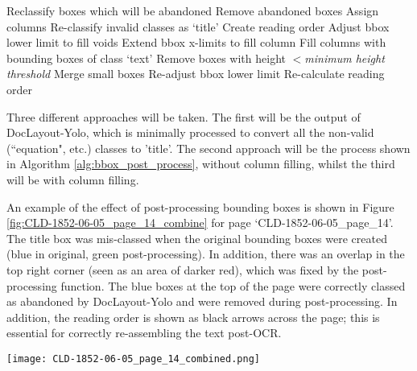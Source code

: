\documentclass{article} %
\begin{document}
\begin{algorithm}
\caption{Bounding Box Processing Algorithm}
\begin{algorithmic}[1]
\State Reclassify boxes which will be abandoned
\State Remove abandoned boxes
\State Assign columns
\State Re-classify invalid classes as `title'
\State Create reading order
\State Adjust bbox lower limit to fill voids
\State Extend bbox x-limits to fill column
    \State Fill columns with bounding boxes of class `text'
\EndIf
\State Remove boxes with height $<$\textit{minimum height threshold}
\State Merge small boxes
\State Re-adjust bbox lower limit
\State Re-calculate reading order
\end{algorithmic}
\label{alg:bbox_post_process}
\end{algorithm}

Three different approaches will be taken. The first will be the output of DocLayout-Yolo, which is minimally processed to convert all the non-valid (``equation", etc.) classes to 'title'. The second approach will be the process shown in Algorithm \ref{alg:bbox_post_process}, without column filling, whilst the third will be with column filling. 

An example of the effect of post-processing bounding boxes is shown in Figure \ref{fig:CLD-1852-06-05_page_14_combine} for page `CLD-1852-06-05\_page\_14'. The title box was mis-classed when the original bounding boxes were created (blue in original, green post-processing). In addition, there was an overlap in the top right corner (seen as an area of darker red), which was fixed by the post-processing function. The blue boxes at the top of the page were correctly classed as abandoned by DocLayout-Yolo and were removed during post-processing. In addition, the reading order is shown as black arrows across the page; this is essential for correctly re-assembling the text post-OCR.

\begin{figure*}
    \centering
    \texttt{[image: CLD-1852-06-05\_page\_14\_combined.png]}
    \caption{The affect of post-processing bounding boxes is shown for page `CLD-1852-06-05\_page\_14'. Post-processing caused box re-classification and the removal of overlaps as well as the addition of the reading order shown as black arrows. }
    \label{fig:CLD-1852-06-05_page_14_combine}
\end{figure*}
\end{document}
